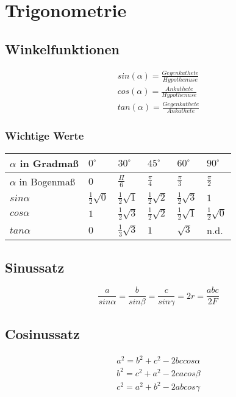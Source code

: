\section{Trigonometrie}
	  \subsection{Winkelfunktionen}
	  \begin{align}
	    sin(\alpha) = \frac{Gegenkathete}{Hypothenuse}\\
	    cos(\alpha) = \frac{Ankathete}{Hypothenuse}\\
	    tan(\alpha) = \frac{Gegenkathete}{Ankathete} \label{eq:trigo_Winkelf}
	  \end{align}
	  
	  \subsubsection{Wichtige Werte}
	  \renewcommand{\arraystretch}{1.5}
	  \begin{tabular}{|p{3.2cm}|p{1.8cm}|p{1.8cm}|p{1.8cm}|p{1.8cm}|p{1.8cm}|}\hline
	  $\alpha$ in Gradmaß & $0^{\circ}$ & $30^{\circ}$ & $45^{\circ}$ & $60^{\circ}$ & $90^{\circ}$ \\ \hline
	  $\alpha$ in Bogenmaß & $0$ & $\frac{\Pi}{6}$ & $\frac{\pi}{4}$ & $\frac{\pi}{3}$ & $\frac{\pi}{2}$ \\ \hline
	  $sin\alpha$ & $\frac{1}{2}\sqrt{0}$ & $\frac{1}{2}\sqrt{1}$ & $\frac{1}{2} \sqrt{2}$ & $\frac{1}{2}\sqrt{3}$ & $1$ \\ \hline
	  $cos\alpha$ & $1$ & $\frac{1}{2}\sqrt{3}$ & $\frac{1}{2}\sqrt{2}$ & $\frac{1}{2}\sqrt{1}$ & $\frac{1}{2}\sqrt{0}$ \\ \hline
	  $tan\alpha$ & $0$ & $\frac{1}{3}\sqrt{3}$ & $1$ & $\sqrt{3}$ & n.d. \\ \hline
	  \end{tabular}
	  \renewcommand{\arraystretch}{1}
	  
	  \subsection{Sinussatz}
	  \begin{equation}
	    \frac{a}{sin\alpha} = \frac{b}{sin\beta} = \frac{c}{sin\gamma} = 2r = \frac{abc}{2F} \label{eq:allg_sinussatz}  
	  \end{equation}
	  
	  \subsection{Cosinussatz}
	  \begin{align}   
	    a^2 = b^2 + c^2 - 2bc cos\alpha\\
	    b^2 = c^2 + a^2 - 2ca cos\beta\\
	    c^2 = a^2 + b^2 - 2ab cos\gamma \label{eq:trigo_cosinussatz}
	  \end{align}
	  

